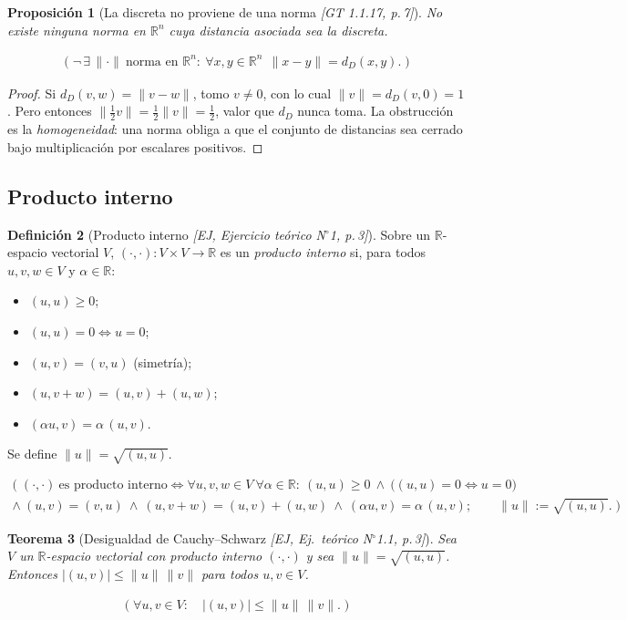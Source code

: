 \documentclass[11pt,a4paper]{article}
\newenvironment{lista}{\leavevmode\begin{itemize}[leftmargin=1.5em,itemsep=1pt,topsep=2pt,parsep=0pt]}{\end{itemize}}
\newcommand{\lgc}[1]{\par\vspace{-3pt}\begin{gather*}\big(\;#1\;\big)\end{gather*}\vspace{-6pt}}
\theoremstyle{definition}
\newtheorem{definicion}{Definición}[section]
\theoremstyle{plain}
\newtheorem{teorema}[definicion]{Teorema}
\newtheorem{proposicion}[definicion]{Proposición}
\newcommand{\fnt}[1]{{\normalfont\small\itshape\color{gray!150!black}[#1]}}
\newcommand{\R}{\mathbb{R}}
\newcommand{\norm}[1]{\lVert #1 \rVert}
\begin{document}
\begin{proposicion}[La discreta no proviene de una norma \fnt{GT 1.1.17, p.\,7}]
No existe ninguna norma en $\R^n$ cuya distancia asociada sea la discreta.
\lgc{\neg\,\exists\,\norm{\cdot}\ \text{norma en }\R^n:\ \forall x,y\in\R^n\ \ \norm{x-y}=d_D(x,y).}
\end{proposicion}

\begin{proof}
Si $d_D(v,w)=\norm{v-w}$, tomo $v\ne 0$, con lo cual $\norm{v}=d_D(v,0)=1$. Pero entonces $\norm{\tfrac12 v}=\tfrac12\norm{v}=\tfrac12$, valor que $d_D$ nunca toma. La obstrucción es la \emph{homogeneidad}: una norma obliga a que el conjunto de distancias sea cerrado bajo multiplicación por escalares positivos.
\end{proof}


\subsection{Producto interno}

\begin{definicion}[Producto interno \fnt{EJ, Ejercicio teórico N$^\circ$1, p.\,3}]
Sobre un $\R$-espacio vectorial $V$, $(\cdot,\cdot):V\times V\to\R$ es un \emph{producto interno} si, para todos $u,v,w\in V$ y $\alpha\in\R$:
\begin{lista}
\item $(u,u)\ge 0$;
\item $(u,u)=0\iff u=0$;
\item $(u,v)=(v,u)$ (simetría);
\item $(u,v+w)=(u,v)+(u,w)$;
\item $(\alpha u,v)=\alpha\,(u,v)$.
\end{lista}
Se define $\norm{u}=\sqrt{(u,u)}$.
\lgc{(\cdot,\cdot)\ \text{es producto interno}\iff \forall u,v,w\in V\ \forall\alpha\in\R:\
(u,u)\ge0\ \wedge\ \big((u,u)=0\Leftrightarrow u=0\big)\\
\wedge\ (u,v)=(v,u)\ \wedge\ (u,v+w)=(u,v)+(u,w)\ \wedge\ (\alpha u,v)=\alpha\,(u,v);\qquad
\norm{u}:=\sqrt{(u,u)}.}
\end{definicion}

\begin{teorema}[Desigualdad de Cauchy--Schwarz \fnt{EJ, Ej.\ teórico N$^\circ$1.1, p.\,3}]
Sea $V$ un $\R$-espacio vectorial con producto interno $(\cdot,\cdot)$ y sea $\norm{u}=\sqrt{(u,u)}$. Entonces $|(u,v)|\le \norm{u}\,\norm{v}$ para todos $u,v\in V$.
\lgc{\forall u,v\in V:\quad |(u,v)|\le\norm{u}\,\norm{v}.}
\end{teorema}
\end{document}
